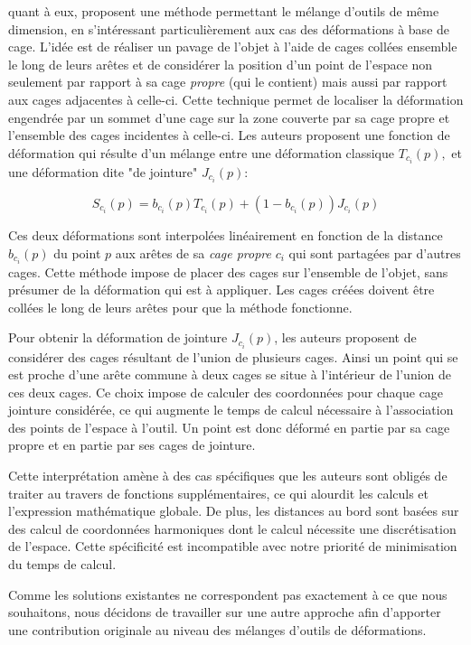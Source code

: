 \cite{GPCP13} quant à eux, proposent une méthode permettant le mélange
d'outils de même dimension, en s'intéressant particulièrement aux cas des
déformations à base de cage. L'idée est de réaliser un pavage de l'objet à
l'aide de cages collées ensemble le long de leurs arêtes et de considérer la
position d'un point de l'espace non seulement par rapport à sa cage
\textit{propre} (qui le contient) mais aussi par rapport aux cages adjacentes
à celle-ci. Cette technique permet de localiser la déformation engendrée par
un sommet d'une cage sur la zone couverte par sa cage propre et l'ensemble des
cages incidentes à celle-ci. Les auteurs proposent une fonction de déformation
qui résulte d'un mélange entre une déformation classique $T_{c_i}(p),$ et une
déformation dite "de jointure" $J_{c_i}(p)$:

\begin{equation}
  S_{c_i}(p) = b_{c_i}(p) T_{c_i}(p) + (1-b_{c_i}(p)) J_{c_i}(p)
\end{equation}

Ces deux déformations sont interpolées linéairement en fonction de la distance
$b_{c_i}(p)$ du point $p$ aux arêtes de sa \textit{cage propre} $c_i$  qui
sont partagées par d'autres cages. Cette méthode impose de placer des cages
sur l'ensemble de l'objet, sans présumer de la déformation qui est à
appliquer. Les cages créées doivent être collées le long de leurs arêtes pour
que la méthode fonctionne.

Pour obtenir la déformation de jointure $J_{c_i}(p)$, les auteurs proposent de
considérer des cages résultant de l'union de plusieurs cages. Ainsi un point
qui se est proche d'une arête commune à deux cages se situe à l'intérieur de
l'union de ces deux cages. Ce choix impose de calculer des coordonnées pour
chaque cage jointure considérée, ce qui augmente le temps de calcul nécessaire
à l'association des points de l'espace à l'outil. Un point est donc déformé en
partie par sa cage propre et en partie par ses cages de jointure.

Cette interprétation amène à des cas spécifiques que les auteurs sont obligés
de traiter au travers de fonctions supplémentaires, ce qui alourdit les
calculs et l'expression mathématique globale. De plus, les distances au bord
sont basées sur des calcul de coordonnées harmoniques dont le calcul nécessite une
discrétisation de l'espace. Cette spécificité est incompatible avec notre
priorité de minimisation du temps de calcul.

Comme les solutions existantes ne correspondent pas exactement à ce que nous
souhaitons, nous décidons de travailler sur une autre approche afin
d'apporter une contribution originale au niveau des mélanges d'outils de
déformations. 

